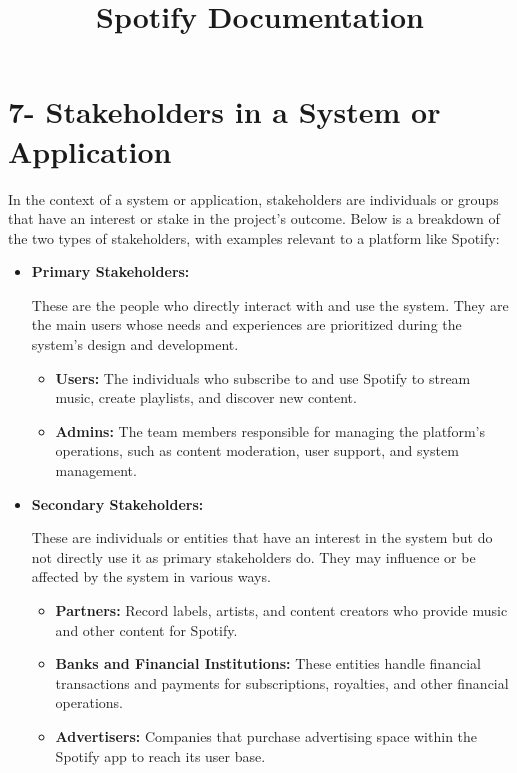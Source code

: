 \documentclass[a4paper,10pt]{article}
\title{Spotify Documentation}
\date{}
\begin{document}
\maketitle
\section*{7- Stakeholders in a System or Application}

In the context of a system or application, stakeholders are individuals or groups that have an interest or stake in the project's outcome. Below is a breakdown of the two types of stakeholders, with examples relevant to a platform like Spotify:

\begin{itemize}
    \item \textbf{Primary Stakeholders:}
    
    These are the people who directly interact with and use the system. They are the main users whose needs and experiences are prioritized during the system's design and development.
    
    \begin{itemize}
        \item \textbf{Users:} The individuals who subscribe to and use Spotify to stream music, create playlists, and discover new content.
        
        \item \textbf{Admins:} The team members responsible for managing the platform’s operations, such as content moderation, user support, and system management.
    \end{itemize}

    \item \textbf{Secondary Stakeholders:}
    
    These are individuals or entities that have an interest in the system but do not directly use it as primary stakeholders do. They may influence or be affected by the system in various ways.
    
    \begin{itemize}
        \item \textbf{Partners:} Record labels, artists, and content creators who provide music and other content for Spotify.
        
        \item \textbf{Banks and Financial Institutions:} These entities handle financial transactions and payments for subscriptions, royalties, and other financial operations.
        
        \item \textbf{Advertisers:} Companies that purchase advertising space within the Spotify app to reach its user base.
    \end{itemize}
    
\end{itemize}
\end{document}
